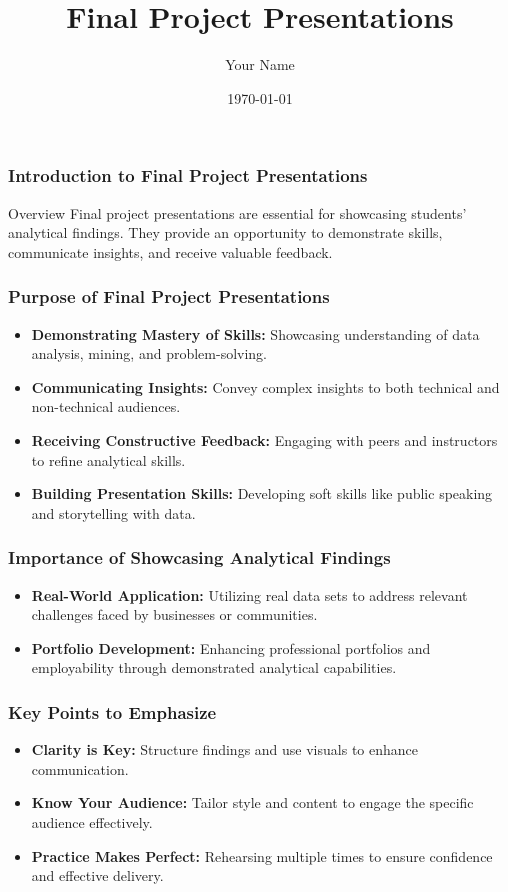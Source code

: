 \documentclass{beamer}
\title{Final Project Presentations}
\author{Your Name}
\institute{Your Institution}
\date{\today}
\begin{document}
\frame{\titlepage}

\begin{frame}[fragile]
    \frametitle{Introduction to Final Project Presentations}
    \begin{block}{Overview}
        Final project presentations are essential for showcasing students' analytical findings. They provide an opportunity to demonstrate skills, communicate insights, and receive valuable feedback.
    \end{block}
\end{frame}

\begin{frame}[fragile]
    \frametitle{Purpose of Final Project Presentations}
    \begin{itemize}
        \item \textbf{Demonstrating Mastery of Skills:} Showcasing understanding of data analysis, mining, and problem-solving.
        \item \textbf{Communicating Insights:} Convey complex insights to both technical and non-technical audiences.
        \item \textbf{Receiving Constructive Feedback:} Engaging with peers and instructors to refine analytical skills.
        \item \textbf{Building Presentation Skills:} Developing soft skills like public speaking and storytelling with data.
    \end{itemize}
\end{frame}

\begin{frame}[fragile]
    \frametitle{Importance of Showcasing Analytical Findings}
    \begin{itemize}
        \item \textbf{Real-World Application:} Utilizing real data sets to address relevant challenges faced by businesses or communities.
        \item \textbf{Portfolio Development:} Enhancing professional portfolios and employability through demonstrated analytical capabilities.
    \end{itemize}
\end{frame}

\begin{frame}[fragile]
    \frametitle{Key Points to Emphasize}
    \begin{itemize}
        \item \textbf{Clarity is Key:} Structure findings and use visuals to enhance communication.
        \item \textbf{Know Your Audience:} Tailor style and content to engage the specific audience effectively.
        \item \textbf{Practice Makes Perfect:} Rehearsing multiple times to ensure confidence and effective delivery.
    \end{itemize}
\end{frame}
\end{document}
